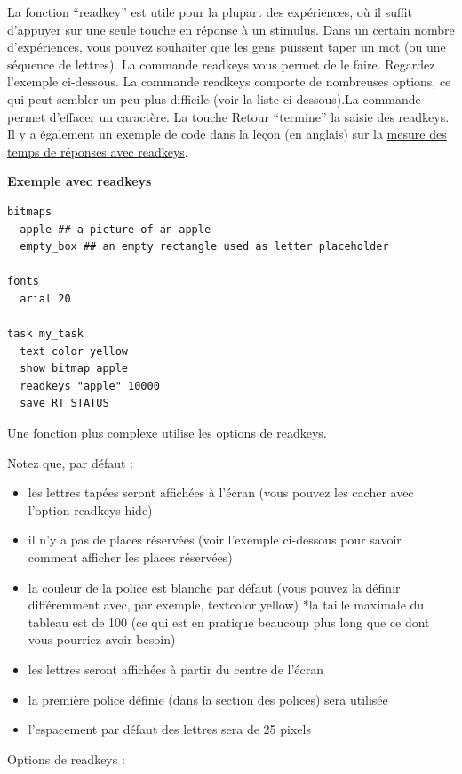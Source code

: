 \documentclass[
]{book}
\providecommand{\tightlist}{%
  \setlength{\itemsep}{0pt}\setlength{\parskip}{0pt}}
\begin{document}
La fonction ``readkey'' est utile pour la plupart des expériences, où il suffit d'appuyer sur une seule touche en réponse à un stimulus. Dans un certain nombre d'expériences, vous pouvez souhaiter que les gens puissent taper un mot (ou une séquence de lettres). La commande readkeys vous permet de le faire. Regardez l'exemple ci-dessous. La commande readkeys comporte de nombreuses options, ce qui peut sembler un peu plus difficile (voir la liste ci-dessous).La commande permet d'effacer un caractère. La touche Retour ``termine'' la saisie des readkeys.
Il y a également un exemple de code dans la leçon (en anglais) sur la \href{https://www.psytoolkit.org/lessons/readkeys.html}{mesure des temps de réponses avec readkeys}.

\textbf{Exemple avec readkeys}

\begin{verbatim}
bitmaps
  apple ## a picture of an apple
  empty_box ## an empty rectangle used as letter placeholder

fonts
  arial 20

task my_task
  text color yellow
  show bitmap apple
  readkeys "apple" 10000
  save RT STATUS
\end{verbatim}

Une fonction plus complexe utilise les options de readkeys.

Notez que, par défaut :

\begin{itemize}
\tightlist
\item
  les lettres tapées seront affichées à l'écran (vous pouvez les cacher avec l'option readkeys hide)
\item
  il n'y a pas de places réservées (voir l'exemple ci-dessous pour savoir comment afficher les places réservées)
\item
  la couleur de la police est blanche par défaut (vous pouvez la définir différemment avec, par exemple, textcolor yellow)
  *la taille maximale du tableau est de 100 (ce qui est en pratique beaucoup plus long que ce dont vous pourriez avoir besoin)
\item
  les lettres seront affichées à partir du centre de l'écran
\item
  la première police définie (dans la section des polices) sera utilisée
\item
  l'espacement par défaut des lettres sera de 25 pixels
\end{itemize}

Options de readkeys :
\end{document}
